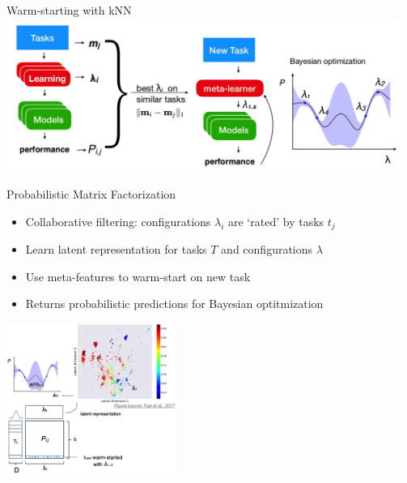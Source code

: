 \documentclass[aspectratio=169,t,handout,xcolor={usenames,dvipsnames}]{beamer}
\begin{document}
\begin{frame}{Warm-starting with kNN}
    \centering\includegraphics[height=5cm]{image/Jietu20220328-204255.jpg}
\end{frame}
\begin{frame}{Probabilistic Matrix Factorization}
    \begin{itemize}
        \item Collaborative filtering: configurations $\lambda_i$ are `rated’ by tasks  $t_j$
        \item Learn  latent representation for tasks $T$ and configurations $\lambda$
        \item Use meta-features to warm-start on new task
        \item Returns probabilistic predictions for Bayesian optitmization

    \end{itemize}
    \centering\includegraphics[height=5cm]{image/Jietu20220328-204634.jpg}
\end{frame}
\end{document}
